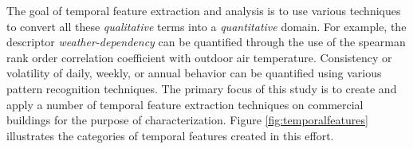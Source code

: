 The goal of temporal feature extraction and analysis is to use various techniques to convert all these \emph{qualitative} terms into a \emph{quantitative} domain. For example, the descriptor \emph{weather-dependency} can be quantified through the use of the spearman rank order correlation coefficient with outdoor air temperature. Consistency or volatility of daily, weekly, or annual behavior can be quantified using various pattern recognition techniques. The primary focus of this study is to create and apply a number of temporal feature extraction techniques on commercial buildings for the purpose of characterization. Figure \ref{fig:temporalfeatures} illustrates the categories of temporal features created in this effort.